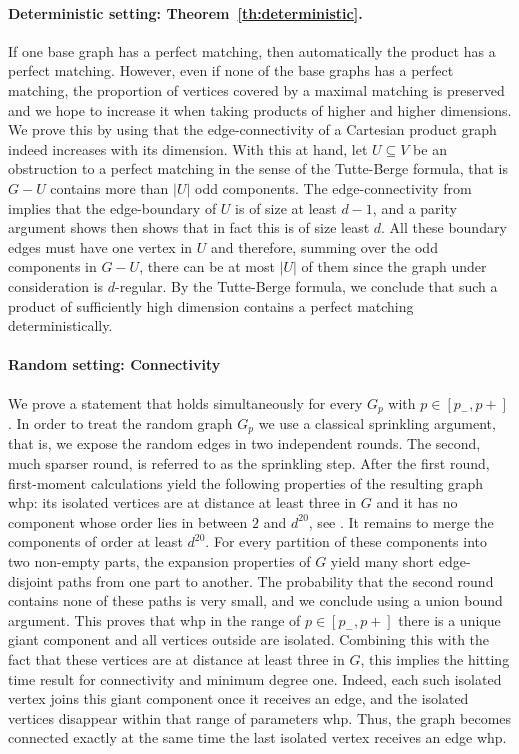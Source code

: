 \documentclass[10pt,a4paper]{article}
\begin{document}
\paragraph{Deterministic setting: Theorem~\ref{th:deterministic}.}
If one base graph has a perfect matching, then automatically the product has a perfect matching. However, even if none of the base graphs has a perfect matching, the proportion of vertices covered by a maximal matching is preserved and we hope to increase it when taking products of higher and higher dimensions. We prove this by using that the edge-connectivity of a Cartesian product graph indeed increases with its dimension. With this at hand, let $U \subseteq V$ be an obstruction to a perfect matching in the sense of the Tutte-Berge formula, that is $G - U$ contains more than $|U|$ odd components. The edge-connectivity from  implies that the edge-boundary of $U$ is of size at least $d-1$, and a parity argument shows then shows that in fact this is of size least $d$. All these boundary edges must have one vertex in $U$ and therefore, summing over the odd components in $G-U$, there can be at most $|U|$ of them since the graph under consideration is $d$-regular. By the Tutte-Berge formula, we conclude that such a product of sufficiently high dimension contains a perfect matching deterministically.


\paragraph{Random setting: Connectivity}

We prove a statement that holds simultaneously for every $G_p$ with $p \in [p_-,p+]$. In order to treat the random graph $G_p$ we use a classical sprinkling argument, that is, we expose the random edges in two independent rounds. The second, much sparser round, is referred to as the sprinkling step. After the first round, first-moment calculations yield the following properties of the resulting graph whp: its isolated vertices are at distance at least three in $G$ and it has no component whose order lies in between $2$ and $d^{20}$, see . It remains to merge the components of order at least $d^{20}$. For every partition of these components into two non-empty parts, the expansion properties of $G$ yield many short edge-disjoint paths from one part to another. The probability that the second round contains none of these paths is very small, and we conclude using a union bound argument. This proves that whp in the range of $p \in [p_-, p+]$ there is a unique giant component and all vertices outside are isolated. Combining this with the fact that these vertices are at distance at least three in $G$, this implies the hitting time result for connectivity and minimum degree one. Indeed, each such isolated vertex joins this giant component once it receives an edge, and the isolated vertices disappear within that range of parameters whp. Thus, the graph becomes connected exactly at the same time the last isolated vertex receives an edge whp.
\end{document}
